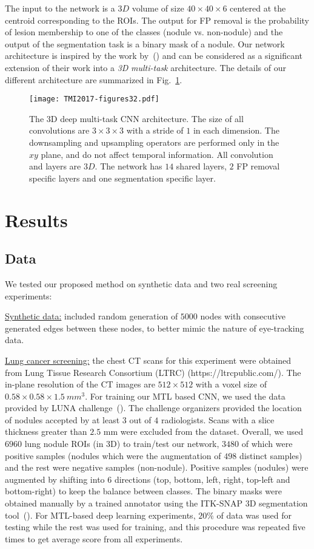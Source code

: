 \documentclass[preprint,12pt]{elsarticle}
\begin{document}
The input to the network is a $3D$ volume of size $40\times 40\times 6$ centered at the centroid corresponding to the ROIs. The output for FP removal is the probability of lesion membership to one of the classes (nodule vs. non-nodule) and the output of the segmentation task is a binary mask of a nodule. Our network architecture is inspired by the work by~(\cite{badrinarayanan2017segnet}) and can be considered as a significant extension of their work into a \textit{3D} \textit{multi-task} architecture. The details of our different architecture are summarized in Fig.~\ref{fig:architecture}.

\begin{figure}[h]
\centering
\texttt{[image: TMI2017-figures32.pdf]}
\caption{The 3D deep multi-task CNN architecture. The size of all convolutions are $3\times 3\times 3$ with a stride of $1$ in each dimension. The downsampling and upsampling operators are performed only in the $xy$ plane, and do not affect temporal information. All convolution and layers are $3D$. The network has $14$ shared layers, $2$ FP removal specific layers and one segmentation specific layer. \label{fig:architecture}}
\end{figure}

\section{Results}
\subsection{Data}
We tested our proposed method on synthetic data and two real screening experiments:

\underline{Synthetic data:} included random generation of $5000$ nodes with consecutive generated edges between these nodes, to better mimic the nature of eye-tracking data. 

\underline{Lung cancer screening:} the chest CT scans for this experiment were obtained from  Lung Tissue Research Consortium (LTRC) (https://ltrcpublic.com/). The in-plane resolution of the CT images are $512\times 512$ with a voxel size of $0.58\times 0.58\times 1.5~mm^{3}$. For training our MTL based CNN, we used the data provided by LUNA challenge~(\cite{LUNA16}). The challenge organizers provided the location of nodules accepted by at least $3$ out of $4$ radiologists. Scans with a slice thickness greater than $2.5$ mm were excluded from the dataset. Overall, we used $6960$ lung nodule ROIs (in 3D) to train/test our network, $3480$ of which were positive samples (nodules which were the augmentation of $498$ distinct samples) and the rest were negative samples (non-nodule). Positive samples (nodules) were augmented by shifting into $6$ directions (top, bottom, left, right, top-left and bottom-right) to keep the balance between classes. The binary masks were obtained manually by a trained annotator using the ITK-SNAP 3D segmentation tool~(\cite{yushkevich2016itk}). For MTL-based deep learning experiments, $20\%$ of data was used for testing while the rest was used for training, and this procedure was repeated five times to get average score from all experiments.
\end{document}
